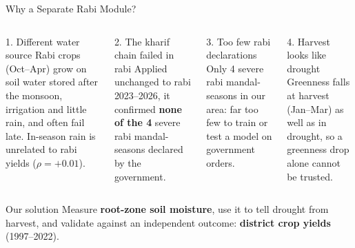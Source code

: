 \documentclass[aspectratio=169,10pt]{beamer}
\begin{document}
\begin{frame}{Why a Separate Rabi Module?}
\begin{columns}[T]
\begin{alertblock}{1. Different water source}
\footnotesize Rabi crops (Oct--Apr) grow on soil water stored after the monsoon, irrigation and little rain, and often fail late. In-season rain is unrelated to rabi yields ($\rho = +0.01$).
\end{alertblock}
\begin{alertblock}{2. The kharif chain failed in rabi}
\footnotesize Applied unchanged to rabi 2023--2026, it confirmed \textbf{none of the 4} severe rabi mandal-seasons declared by the government.
\end{alertblock}
\begin{alertblock}{3. Too few rabi declarations}
\footnotesize Only 4 severe rabi mandal-seasons in our area: far too few to train or test a model on government orders.
\end{alertblock}
\begin{alertblock}{4. Harvest looks like drought}
\footnotesize Greenness falls at harvest (Jan--Mar) as well as in drought, so a greenness drop alone cannot be trusted.
\end{alertblock}
\end{columns}
\vspace{3mm}
\begin{exampleblock}{Our solution}
\footnotesize Measure \textbf{root-zone soil moisture}, use it to tell drought from harvest, and validate against an independent outcome: \textbf{district crop yields} (1997--2022).
\end{exampleblock}
\end{frame}
\end{document}
